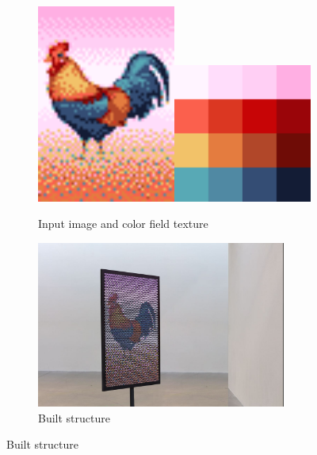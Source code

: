 \documentclass{article}
\begin{document}
\begin{figure}[ht!]
\centering
  \begin{subfigure}[t]{0.45\textwidth}
    \centering
    \includegraphics[width=0.5\textwidth]{images/rooster/input_0.png}\includegraphics[width=0.5\textwidth]{images/rooster/texture.png}
    \caption{Input image and color field texture}
  \end{subfigure}
  \begin{subfigure}[t]{0.45\textwidth}
    \centering
    \includegraphics[width=0.9\textwidth]{images/results/leonardo.jpg}
    \caption{Built structure}
  \end{subfigure}
\end{figure}
\end{document}
